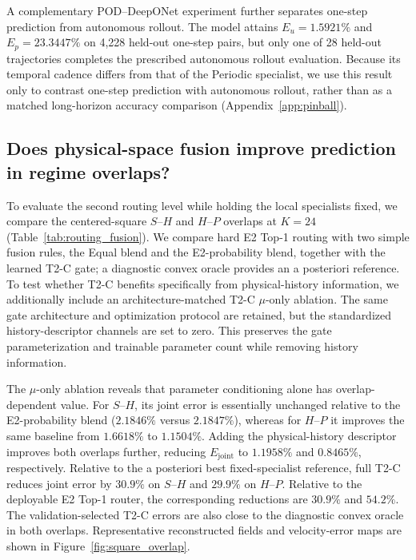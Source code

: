\documentclass{article}
\begin{document}
A complementary POD--DeepONet experiment further separates one-step prediction from autonomous rollout.
The model attains $E_u=1.5921\%$ and $E_p=23.3447\%$ on 4,228 held-out one-step pairs, but only one of 28 held-out trajectories completes the prescribed autonomous rollout evaluation. Because its temporal cadence differs from that of the Periodic specialist, we use this result only to contrast one-step prediction with autonomous rollout, rather than as a matched long-horizon accuracy comparison (Appendix~\ref{app:pinball}).





\subsection{Does physical-space fusion improve prediction in regime overlaps?}
To evaluate the second routing level while holding the local specialists fixed, we compare the centered-square $S$--$H$ and $H$--$P$ overlaps at $K=24$ (Table~\ref{tab:routing_fusion}). We compare hard E2 Top-1 routing with two simple fusion rules, the Equal blend and the E2-probability blend, together with the learned T2-C gate; a diagnostic convex oracle provides an a posteriori reference. To test whether T2-C benefits specifically from physical-history information, we additionally include an architecture-matched T2-C $\mu$-only ablation. The same gate architecture and optimization protocol are retained, but the standardized history-descriptor channels are set to zero. This preserves the gate parameterization and trainable parameter count while removing history information.


The $\mu$-only ablation reveals that parameter conditioning alone has overlap-dependent value. For $S$--$H$, its joint error is essentially unchanged relative to the E2-probability blend ($2.1846\%$ versus $2.1847\%$), whereas for $H$--$P$ it improves the same baseline from $1.6618\%$ to $1.1504\%$. Adding the physical-history descriptor improves both overlaps further, reducing $E_{\mathrm{joint}}$ to $1.1958\%$ and $0.8465\%$, respectively. Relative to the a posteriori best fixed-specialist reference, full T2-C reduces joint error by $30.9\%$ on $S$--$H$ and $29.9\%$ on $H$--$P$. Relative to the deployable E2 Top-1 router, the corresponding reductions are $30.9\%$ and $54.2\%$. The validation-selected T2-C errors are also close to the diagnostic convex oracle in both overlaps. Representative reconstructed fields and velocity-error maps are shown in Figure~\ref{fig:square_overlap}.
\end{document}
